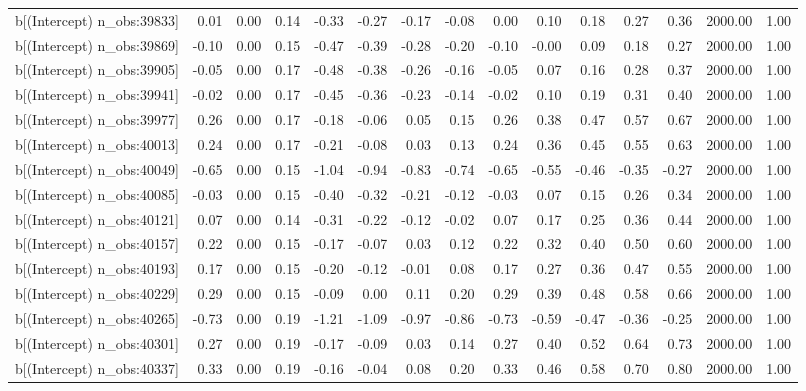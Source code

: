 \begin{table}[ht]
\begin{tabular}{rrrrrrrrrrrrrrr}
  b[(Intercept) n\_obs:39833] & 0.01 & 0.00 & 0.14 & -0.33 & -0.27 & -0.17 & -0.08 & 0.00 & 0.10 & 0.18 & 0.27 & 0.36 & 2000.00 & 1.00 \\ 
  b[(Intercept) n\_obs:39869] & -0.10 & 0.00 & 0.15 & -0.47 & -0.39 & -0.28 & -0.20 & -0.10 & -0.00 & 0.09 & 0.18 & 0.27 & 2000.00 & 1.00 \\ 
  b[(Intercept) n\_obs:39905] & -0.05 & 0.00 & 0.17 & -0.48 & -0.38 & -0.26 & -0.16 & -0.05 & 0.07 & 0.16 & 0.28 & 0.37 & 2000.00 & 1.00 \\ 
  b[(Intercept) n\_obs:39941] & -0.02 & 0.00 & 0.17 & -0.45 & -0.36 & -0.23 & -0.14 & -0.02 & 0.10 & 0.19 & 0.31 & 0.40 & 2000.00 & 1.00 \\ 
  b[(Intercept) n\_obs:39977] & 0.26 & 0.00 & 0.17 & -0.18 & -0.06 & 0.05 & 0.15 & 0.26 & 0.38 & 0.47 & 0.57 & 0.67 & 2000.00 & 1.00 \\ 
  b[(Intercept) n\_obs:40013] & 0.24 & 0.00 & 0.17 & -0.21 & -0.08 & 0.03 & 0.13 & 0.24 & 0.36 & 0.45 & 0.55 & 0.63 & 2000.00 & 1.00 \\ 
  b[(Intercept) n\_obs:40049] & -0.65 & 0.00 & 0.15 & -1.04 & -0.94 & -0.83 & -0.74 & -0.65 & -0.55 & -0.46 & -0.35 & -0.27 & 2000.00 & 1.00 \\ 
  b[(Intercept) n\_obs:40085] & -0.03 & 0.00 & 0.15 & -0.40 & -0.32 & -0.21 & -0.12 & -0.03 & 0.07 & 0.15 & 0.26 & 0.34 & 2000.00 & 1.00 \\ 
  b[(Intercept) n\_obs:40121] & 0.07 & 0.00 & 0.14 & -0.31 & -0.22 & -0.12 & -0.02 & 0.07 & 0.17 & 0.25 & 0.36 & 0.44 & 2000.00 & 1.00 \\ 
  b[(Intercept) n\_obs:40157] & 0.22 & 0.00 & 0.15 & -0.17 & -0.07 & 0.03 & 0.12 & 0.22 & 0.32 & 0.40 & 0.50 & 0.60 & 2000.00 & 1.00 \\ 
  b[(Intercept) n\_obs:40193] & 0.17 & 0.00 & 0.15 & -0.20 & -0.12 & -0.01 & 0.08 & 0.17 & 0.27 & 0.36 & 0.47 & 0.55 & 2000.00 & 1.00 \\ 
  b[(Intercept) n\_obs:40229] & 0.29 & 0.00 & 0.15 & -0.09 & 0.00 & 0.11 & 0.20 & 0.29 & 0.39 & 0.48 & 0.58 & 0.66 & 2000.00 & 1.00 \\ 
  b[(Intercept) n\_obs:40265] & -0.73 & 0.00 & 0.19 & -1.21 & -1.09 & -0.97 & -0.86 & -0.73 & -0.59 & -0.47 & -0.36 & -0.25 & 2000.00 & 1.00 \\ 
  b[(Intercept) n\_obs:40301] & 0.27 & 0.00 & 0.19 & -0.17 & -0.09 & 0.03 & 0.14 & 0.27 & 0.40 & 0.52 & 0.64 & 0.73 & 2000.00 & 1.00 \\ 
  b[(Intercept) n\_obs:40337] & 0.33 & 0.00 & 0.19 & -0.16 & -0.04 & 0.08 & 0.20 & 0.33 & 0.46 & 0.58 & 0.70 & 0.80 & 2000.00 & 1.00 \\ 

\end{tabular}
\end{table}
